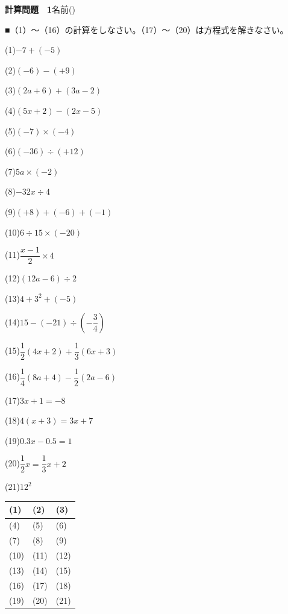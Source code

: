 \documentclass[a4paper,11pt]{ltjsarticle}
\newlength{\qcol}\setlength{\qcol}{0.47\textwidth}
\newlength{\qgap}
\newlength{\anscolw}\setlength{\anscolw}{0.30\textwidth}
\newlength{\ansh}
\newcommand{\Q}[2]{\parbox[t]{\qcol}{\raggedright (#1)\hspace{0.6em}$\displaystyle #2$}}
\newcommand{\QR}[4]{\Q{#1}{#2}\hfill\Q{#3}{#4}\par\vspace{\qgap}}
\newcommand{\anscell}[1]{\rule[-\ansdrop]{0pt}{\ansh}(#1)}
\newlength{\ansdrop}
\begin{document}
{\large\bfseries 計算問題　1}\hfill 名前(\underline{\hspace{32mm}})\par\vspace{3mm}
■（1）〜（16）の計算をしなさい。（17）〜（20）は方程式を解きなさい。\par\vspace{3mm}
\setlength{\qgap}{5.4mm}
\QR{1}{-7+(-5)}{2}{(-6)-(+9)}
\QR{3}{(2a+6)+(3a-2)}{4}{(5x+2)-(2x-5)}
\QR{5}{(-7)\times(-4)}{6}{(-36)\div(+12)}
\QR{7}{5a\times(-2)}{8}{-32x\div4}
\QR{9}{(+8)+(-6)+(-1)}{10}{6\div15\times(-20)}
\QR{11}{\dfrac{x-1}{2}\times4}{12}{(12a-6)\div2}
\QR{13}{4+3^2+(-5)}{14}{15-(-21)\div\left(-\dfrac{3}{4}\right)}
\QR{15}{\dfrac{1}{2}(4x+2)+\dfrac{1}{3}(6x+3)}{16}{\dfrac{1}{4}(8a+4)-\dfrac{1}{2}(2a-6)}
\QR{17}{3x+1=-8}{18}{4(x+3)=3x+7}
\QR{19}{0.3x-0.5=1}{20}{\dfrac{1}{2}x=\dfrac{1}{3}x+2}
\vspace{1mm}
\Q{21}{12^2}\par\vspace{3mm}
\setlength{\ansh}{9.5mm}\setlength{\ansdrop}{6mm}%
\begin{center}\begin{tabular}{|p{\anscolw}|p{\anscolw}|p{\anscolw}|}\hline
\anscell{1} & \anscell{2} & \anscell{3} \\\hline
\anscell{4} & \anscell{5} & \anscell{6} \\\hline
\anscell{7} & \anscell{8} & \anscell{9} \\\hline
\anscell{10} & \anscell{11} & \anscell{12} \\\hline
\anscell{13} & \anscell{14} & \anscell{15} \\\hline
\anscell{16} & \anscell{17} & \anscell{18} \\\hline
\anscell{19} & \anscell{20} & \anscell{21} \\\hline
\end{tabular}\end{center}
\end{document}
